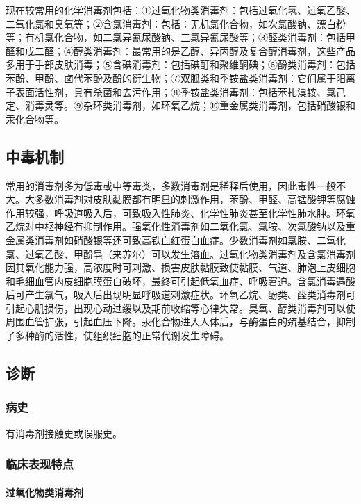 现在较常用的化学消毒剂包括：①过氧化物类消毒剂：包括过氧化氢、过氧乙酸、二氧化氯和臭氧等；②含氯消毒剂：包括：无机氯化合物，如次氯酸钠、漂白粉等；有机氯化合物，如二氯异氰尿酸钠、三氯异氰尿酸等；③醛类消毒剂：包括甲醛和戊二醛；④醇类消毒剂：最常用的是乙醇、异丙醇及复合醇消毒剂，这些产品多用于手部皮肤消毒；⑤含碘消毒剂：包括碘酊和聚维酮碘；⑥酚类消毒剂：包括苯酚、甲酚、卤代苯酚及酚的衍生物；⑦双胍类和季铵盐类消毒剂：它们属于阳离子表面活性剂，具有杀菌和去污作用；⑧季铵盐类消毒剂：包括苯扎溴铵、氯己定、消毒灵等。⑨杂环类消毒剂，如环氧乙烷；⑩重金属类消毒剂，包括硝酸银和汞化合物等。

\subsection{中毒机制}

常用的消毒剂多为低毒或中等毒类，多数消毒剂是稀释后使用，因此毒性一般不大。大多数消毒剂对皮肤黏膜都有明显的刺激作用，苯酚、甲醛、高锰酸钾等腐蚀作用较强，呼吸道吸入后，可致吸入性肺炎、化学性肺炎甚至化学性肺水肿。环氧乙烷对中枢神经有抑制作用。强氧化性消毒剂如二氧化氯、氯胺、次氯酸钠以及重金属类消毒剂如硝酸银等还可致高铁血红蛋白血症。少数消毒剂如氯胺、二氧化氯、过氧乙酸、甲酚皂（来苏尔）可以发生溶血。过氧化物类消毒剂及含氯消毒剂因其氧化能力强，高浓度时可刺激、损害皮肤黏膜致使黏膜、气道、肺泡上皮细胞和毛细血管内皮细胞膜蛋白破坏，最终可引起低氧血症、呼吸窘迫。含氯消毒遇酸后可产生氯气，吸入后出现明显呼吸道刺激症状。环氧乙烷、酚类、醛类消毒剂可引起心肌损伤，出现心动过缓以及期前收缩等心律失常。臭氧、醇类消毒剂可以使周围血管扩张，引起血压下降。汞化合物进入人体后，与酶蛋白的巯基结合，抑制了多种酶的活性，使组织细胞的正常代谢发生障碍。

\subsection{诊断}

\subsubsection{病史}

有消毒剂接触史或误服史。

\subsubsection{临床表现特点}

\paragraph{过氧化物类消毒剂}

